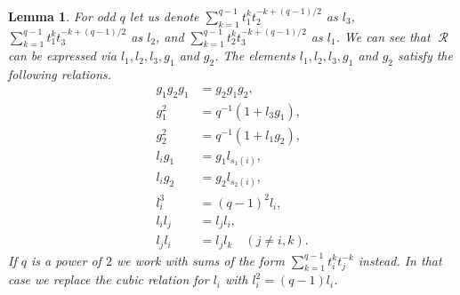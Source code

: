 \documentclass[12pt,reqno]{amsart}
\newtheorem{lem}[thm]{Lemma}
\theoremstyle{definition}
\theoremstyle{remark}
\numberwithin{equation}{section}
\DeclareMathOperator{\R}{\mathcal{R}}
\def\IM#1{\textcolor[rgb]{0.00,0.00,0.75}{[I: #1]}}
\begin{document}








\begin{lem}\label{NCAlgebra_relations}
    For odd $q$ let us denote $\sum_{k=1}^{q-1} t_1^k t_2^{-k + (q-1)/2}$ as $l_{3}$, $\sum_{k=1}^{q-1} t_1^{k} t_3^{-k+(q-1)/2}$ as $l_2$, and \linebreak $\sum_{k=1}^{q-1} t_2^{k} t_3^{-k+(q-1)/2}$ as $l_1$. We can see that $\R$ can be expressed via $l_1,l_2,l_3,g_1$ and $g_2$. The elements $l_1,l_2,l_3,g_1$ and $g_2$ satisfy the following relations.
    \begin{align*}
        g_1g_2g_1 &= g_2g_1g_2,\\
        g_1^2 &= q^{-1}(1 + l_3g_1),\\
        g_2^2 &= q^{-1}(1 + l_1g_2),\\
        l_i g_1 &= g_1 l_{s_1(i)},\\
        l_i g_2 &= g_2 l_{s_2(i)},\\
        l_i^3 &= (q-1)^2l_i,\\
        l_i l_j &= l_j l_i,\\
        l_j l_i &= l_j l_k \quad (j \ne i, k).
    \end{align*}
    If $q$ is a power of $2$ we work with sums of the form $\sum_{k=1}^{q-1}t_i^kt_j^{-k}$ instead. In that case we replace the cubic relation for $l_i$ with $l_i^2=(q-1)l_i$.
\end{lem}
\end{document}
